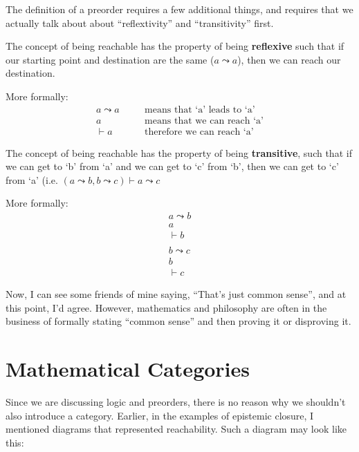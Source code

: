 The definition of a preorder requires a few additional things, and requires that we actually talk about about ``reflextivity'' and ``transitivity'' first.

\begin{definition}
The concept of being reachable has the property of being \textbf{reflexive} such that if our starting point and destination are the same ($a \leadsto a$), then we can reach our destination.
\end{definition}

More formally:
\begin{align*}
    a \leadsto a & \quad & \text{means that `a' leads to `a'} \\
    a & \quad & \text{means that we can reach `a'}\\
    \vdash a & \quad & \text{therefore we can reach `a'}
\end{align*}

\begin{definition}
The concept of being reachable has the property of being \textbf{transitive}, such that if we can get to `b' from `a' and we can get to `c' from `b', then we can get to `c' from `a' (i.e. $(a\leadsto b, b \leadsto c)\vdash a \leadsto c$
\end{definition}

More formally:
\begin{align*}
    a \leadsto b \\
    a \\
    \vdash b \\
    \\
    b \leadsto c \\
    b \\
    \vdash c
\end{align*}

Now, I can see some friends of mine saying, ``That's just common sense'', and at this point, I'd agree. However, mathematics and philosophy are often in the business of formally stating ``common sense'' and then proving it or disproving it.

\section{Mathematical Categories}

Since we are discussing logic and preorders, there is no reason why we shouldn't also introduce a category. Earlier, in the examples of epistemic closure, I mentioned diagrams that represented reachability. Such a diagram may look like this:



